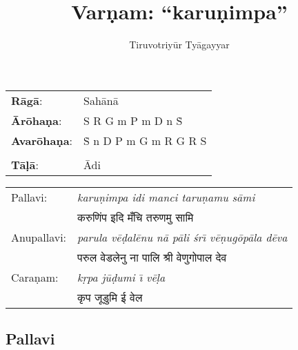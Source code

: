 \documentclass[12pt]{article}
\title{Var\d{n}am: ``karu\d nimpa''}
\author{Tiruvotriy\=ur Ty\=agayyar}
\date{}                                           %
\def \deva#1{{\fontspec{DevanagariMT}#1}}
\begin{document}
\maketitle
\begin{tabular}{ll}
\textbf{R\=ag\=a}: & Sah\=an\=a \\
\textbf{\=Ar\=oha\d na}: & S R G m P m D n \.S \\
\textbf{Avar\=oha\d na}: & \.S n D P m G m R G R S \\\\
\textbf{T\=a\d l\=a}: & \=Adi
\end{tabular}

\vspace{0.25 in}

\begin{tabular}{ll}
Pallavi: & \emph{karu\d nimpa idi manci taru\d namu s\=ami} \\
& \deva{करुणिंप इदि मँचि तरुणमु सामि}\\
Anupallavi: & \emph{parula v\=e\d{d}al\=enu n\=a p\=ali \'sr\=\i{} v\=e\d{n}ug\=op\=ala d\=eva} \\
&  \deva{परुल वेडलेनु ना पालि श्री वेणुगोपाल देव}\\
Cara\d nam: & \emph{k\d rpa j\=u\d dumi \=\i{} v\=e\d{l}a}\\
&  \deva{कृप जूडुमि ई वेल}
\end{tabular}

\def \speed{0.276in}
\def \f#1{\makebox[0.069in][l]{#1}}
\def \t#1{\makebox[0.138in][l]{#1}}
\def \s#1{\makebox[\speed][l]{#1}}

\def \four#1{#1\s{}}
\def \Four#1[#2]{#1#2}
\def \Sl {\s{\d{S}}}
\def \rl {\s{\d{r}}}
\def \Rl {\s{\d{R}}}
\def \gl {\s{\d{g}}}
\def \Gl {\s{\d{G}}}
\def \ml {\s{\d{m}}}
\def \Ml {\s{\d{M}}}
\def \Pl {\s{\d{P}}}
\def \dal {\s{\d{d}}}
\def \Dl {\s{\d{D}}}
\def \nl {\s{\d{n}}}
\def \Nl {\s{\d{N}}}
\def \S {\s{S}}
\def \r {\s{r}}
\def \R {\s{R}}
\def \g {\s{g}}
\def \G {\s{G}}
\def \m {\s{m}}
\def \M {\s{M}}
\def \P {\s{P}}
\def \da {\s{d}}
\def \D {\s{D}}
\def \n {\s{n}}
\def \N {\s{N}}
\def \Su {\s{\.S}}
\def \ru {\s{\.r}}
\def \Ru {\s{\.R}}
\def \gu {\s{\.g}}
\def \Gu {\s{\.G}}
\def \mu {\s{\.m}}
\def \Mu {\s{\.M}}
\def \Pu {\s{\.P}}
\def \dau {\s{\.d}}
\def \Du {\s{\.D}}
\def \nu {\s{\.n}}
\def \Nu {\s{\.N}}
\def \p {\s{,}}

\def \lagu {\s{$||$}}
\def \dhru {\s{$|$}}

\subsection*{Pallavi}
\end{document}
